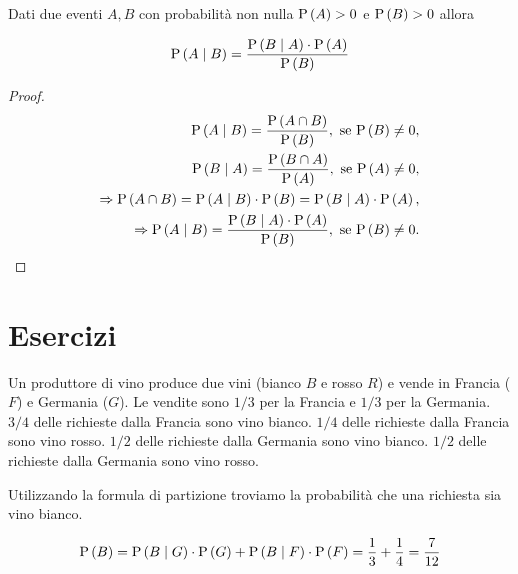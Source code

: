 \begin{lem}
	Dati due eventi $ A,B $ con probabilità non nulla $ \text{P}\left(A\right) > 0 $ e $ \text{P}\left(B\right) > 0 $ allora 
	
	\begin{equation}
	\text{P}\left(A \mid B\right) = \dfrac{\text{P}\left(B \mid A\right) \cdot \text{P}\left(A\right) }{\text{P}\left(B\right)}
	\end{equation}
	
	\begin{proof}
		\begin{equation*}
			\begin{aligned}
				\text{P}\left(A \mid B\right) = \frac{\text{P}\left(A\cap B\right)}{\text{P}\left(B\right)}, \text{ se } \text{P}\left(B\right) \neq 0, \\
				\text{P}\left(B \mid A\right) = \frac{\text{P}\left(B\cap A\right)}{\text{P}\left(A\right)}, \text{ se } \text{P}\left(A\right) \neq 0, \\
				\Rightarrow \text{P}\left(A\cap B\right) =  \text{P}\left(A\mid B\right)\cdot \text{P}\left(B\right)=\text{P}\left(B\mid A\right)\cdot \text{P}\left(A\right), \\
				\Rightarrow \text{P}\left(A \mid B\right) =  \frac{\text{P}\left(B \mid A\right)  \cdot \text{P}\left(A\right)} {\text{P}\left(B\right)}, \text{ se } \text{P}\left(B\right) \neq 0.
			\end{aligned}
		\end{equation*}
	\end{proof}
\end{lem}

\section{Esercizi}


\begin{exrc}
	Un produttore di vino produce due vini (bianco $ B $ e rosso $ R $) e vende in Francia ($ F $) e Germania ($ G $). 
	Le vendite sono $ 1/3 $ per la Francia e $ 1/3 $ per la Germania. $ 3/4 $ delle richieste dalla Francia sono vino bianco. $ 1/4 $ delle richieste dalla Francia sono vino rosso. $ 1/2 $ delle richieste dalla Germania sono vino bianco. $ 1/2 $ delle richieste dalla Germania sono vino rosso.
	
	Utilizzando la formula di partizione troviamo la probabilità che una richiesta sia vino bianco.
	
	\begin{equation*}
	\text{P}\left(B\right) = \text{P}\left(B \mid G\right) \cdot \text{P}\left(G\right) + \text{P}\left(B \mid F\right) \cdot \text{P}\left(F\right) = \dfrac{1}{3} + \dfrac{1}{4} = \dfrac{7}{12}
	\end{equation*}	
\end{exrc}


